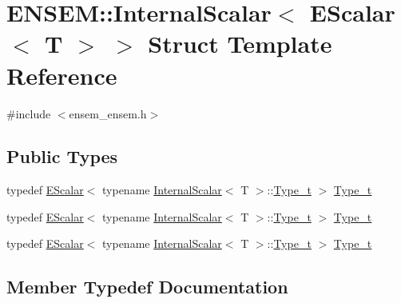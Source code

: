\hypertarget{structENSEM_1_1InternalScalar_3_01EScalar_3_01T_01_4_01_4}{}\section{E\+N\+S\+EM\+:\+:Internal\+Scalar$<$ E\+Scalar$<$ T $>$ $>$ Struct Template Reference}
\label{structENSEM_1_1InternalScalar_3_01EScalar_3_01T_01_4_01_4}


{\ttfamily \#include $<$ensem\+\_\+ensem.\+h$>$}

\subsection*{Public Types}
\begin{DoxyCompactItemize}
\item 
typedef \mbox{\hyperlink{classENSEM_1_1EScalar}{E\+Scalar}}$<$ typename \mbox{\hyperlink{structENSEM_1_1InternalScalar}{Internal\+Scalar}}$<$ T $>$\+::\mbox{\hyperlink{structENSEM_1_1InternalScalar_3_01EScalar_3_01T_01_4_01_4_a2f304cf7e12b0c7a448c8094b39fd90d}{Type\+\_\+t}} $>$ \mbox{\hyperlink{structENSEM_1_1InternalScalar_3_01EScalar_3_01T_01_4_01_4_a2f304cf7e12b0c7a448c8094b39fd90d}{Type\+\_\+t}}
\item 
typedef \mbox{\hyperlink{classENSEM_1_1EScalar}{E\+Scalar}}$<$ typename \mbox{\hyperlink{structENSEM_1_1InternalScalar}{Internal\+Scalar}}$<$ T $>$\+::\mbox{\hyperlink{structENSEM_1_1InternalScalar_3_01EScalar_3_01T_01_4_01_4_a2f304cf7e12b0c7a448c8094b39fd90d}{Type\+\_\+t}} $>$ \mbox{\hyperlink{structENSEM_1_1InternalScalar_3_01EScalar_3_01T_01_4_01_4_a2f304cf7e12b0c7a448c8094b39fd90d}{Type\+\_\+t}}
\item 
typedef \mbox{\hyperlink{classENSEM_1_1EScalar}{E\+Scalar}}$<$ typename \mbox{\hyperlink{structENSEM_1_1InternalScalar}{Internal\+Scalar}}$<$ T $>$\+::\mbox{\hyperlink{structENSEM_1_1InternalScalar_3_01EScalar_3_01T_01_4_01_4_a2f304cf7e12b0c7a448c8094b39fd90d}{Type\+\_\+t}} $>$ \mbox{\hyperlink{structENSEM_1_1InternalScalar_3_01EScalar_3_01T_01_4_01_4_a2f304cf7e12b0c7a448c8094b39fd90d}{Type\+\_\+t}}
\end{DoxyCompactItemize}


\subsection{Member Typedef Documentation}
\mbox{\label{structENSEM_1_1InternalScalar_3_01EScalar_3_01T_01_4_01_4_a2f304cf7e12b0c7a448c8094b39fd90d}} 
